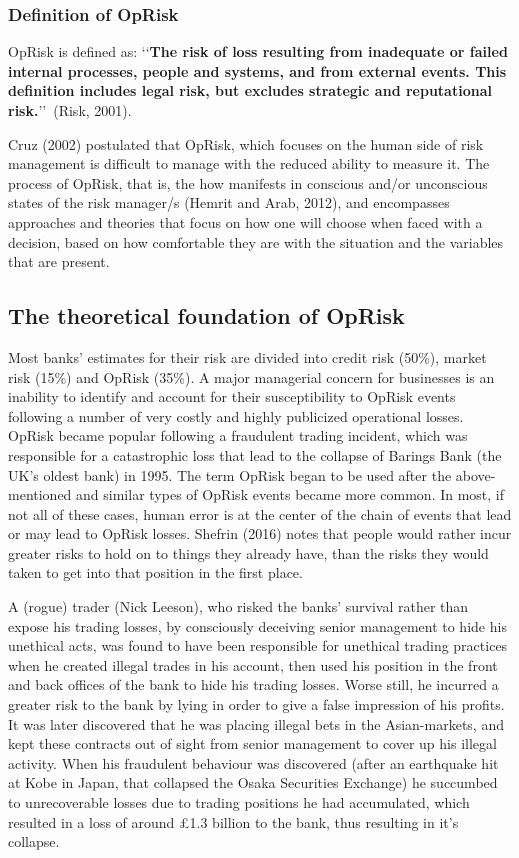 \documentclass[]{DissertateUSU}
\begin{document}
\subsubsection{Definition of OpRisk}

OpRisk is defined as:
\lq\lq \textbf{The risk of loss resulting from inadequate or failed internal processes, people and systems, and from external events. This definition includes legal risk, but excludes strategic and reputational risk.}\rq\rq~(Risk,
2001).\medskip

Cruz (2002) postulated that OpRisk, which focuses on the human side of
risk management is difficult to manage with the reduced ability to
measure it. The process of OpRisk, that is, the how manifests in
conscious and/or unconscious states of the risk manager/s (Hemrit and
Arab, 2012), and encompasses approaches and theories that focus on how
one will choose when faced with a decision, based on how comfortable
they are with the situation and the variables that are present.

\subsection{The theoretical foundation of OpRisk}

Most banks' estimates for their risk are divided into credit risk
(50\%), market risk (15\%) and OpRisk (35\%). A major managerial concern
for businesses is an inability to identify and account for their
susceptibility to OpRisk events following a number of very costly and
highly publicized operational losses. OpRisk became popular following a
fraudulent trading incident, which was responsible for a catastrophic
loss that lead to the collapse of Barings Bank (the UK's oldest bank) in
1995. The term OpRisk began to be used after the above-mentioned and
similar types of OpRisk events became more common. In most, if not all
of these cases, human error is at the center of the chain of events that
lead or may lead to OpRisk losses. Shefrin (2016) notes that people
would rather incur greater risks to hold on to things they already have,
than the risks they would taken to get into that position in the first
place.\medskip

A (rogue) trader (Nick Leeson), who risked the banks' survival rather
than expose his trading losses, by consciously deceiving senior
management to hide his unethical acts, was found to have been
responsible for unethical trading practices when he created illegal
trades in his account, then used his position in the front and back
offices of the bank to hide his trading losses. Worse still, he incurred
a greater risk to the bank by lying in order to give a false impression
of his profits. It was later discovered that he was placing illegal bets
in the Asian-markets, and kept these contracts out of sight from senior
management to cover up his illegal activity. When his fraudulent
behaviour was discovered (after an earthquake hit at Kobe in Japan, that
collapsed the Osaka Securities Exchange) he succumbed to unrecoverable
losses due to trading positions he had accumulated, which resulted in a
loss of around \pounds 1.3 billion to the bank, thus resulting in it's
collapse.\medskip
\end{document}
